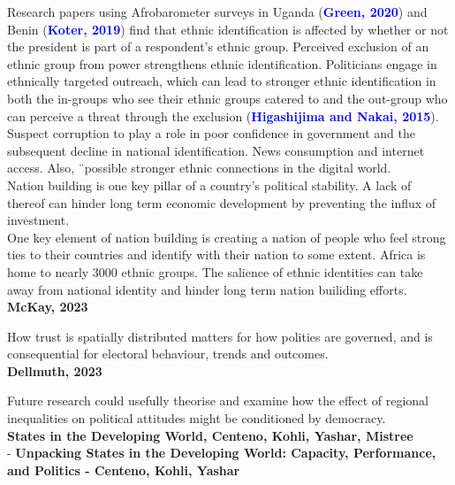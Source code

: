 \documentclass[11pt]{article}
\theoremstyle{plain}
\theoremstyle{plain}
\begin{document}
Research papers using Afrobarometer surveys in Uganda (\textcolor{blue}{\textbf{Green, 2020}}) and Benin (\textcolor{blue}{\textbf{Koter, 2019}}) find that ethnic identification is affected by whether
 or not the president is part of a respondent's ethnic group.
 Perceived exclusion of an ethnic group from power strengthens ethnic identification. Politicians engage in ethnically targeted outreach, which can lead to stronger ethnic identification in both the in-groups who see their ethnic groups catered to and the out-group
  who can perceive a threat through the exclusion (\textcolor{blue}{\textbf{Higashijima and Nakai, 2015}}).\\

Suspect corruption to play a role in poor confidence in government and the subsequent decline in national identification. News consumption and internet access. Also, 
¨possible stronger ethnic connections in the digital world.\\

Nation building is one key pillar of a country's political stability. A lack of thereof can hinder long term economic development by preventing the influx of investment.\\
One key element of nation building is creating a nation of people who feel strong ties to their countries and identify with their nation to some extent. Africa is home to nearly 3000 ethnic groups.
The salience of ethnic identities can take away from national identity and hinder long term nation builiding efforts.\\


\textbf{McKay, 2023}

How trust is spatially distributed matters for how polities are governed, and is consequential for electoral behaviour, trends and outcomes.\\


\textbf{Dellmuth, 2023}

Future research could usefully theorise and examine how the effect of regional inequalities on political attitudes might be conditioned by democracy.\\

\textbf{States in the Developing World, Centeno, Kohli, Yashar, Mistree}\\

- \textbf{Unpacking States in the Developing World: Capacity, Performance, and Politics - Centeno, Kohli, Yashar}
\end{document}
